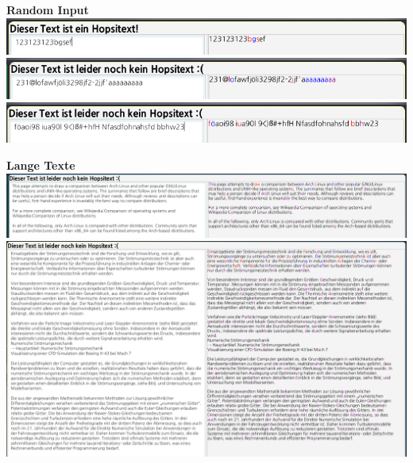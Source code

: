 \documentclass[a4paper,10pt,ngerman]{scrartcl}
\begin{document}
\newpage
\textbf{Random Input}
\newline
\newline
\includegraphics[scale=0.60]{rand1.png}
\newline
\includegraphics[scale=0.60]{rand2.png}
\newline
\includegraphics[scale=0.60]{rand3.png}
\newline
\newline

\textbf{Lange Texte}
\newline
\newline
\includegraphics[scale=0.35]{lang1.png}
\newline
\newline
\includegraphics[scale=0.35]{lang2.png}

\newpage
\end{document}
